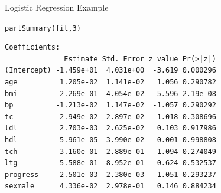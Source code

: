 \documentclass{beamer}\usepackage[]{graphicx}\usepackage[]{color}
\makeatletter
\newcommand{\hlnum}[1]{\textcolor[rgb]{0.69,0.494,0}{#1}}%
\newcommand{\hlstr}[1]{\textcolor[rgb]{0.749,0.012,0.012}{#1}}%
\newcommand{\hlcom}[1]{\textcolor[rgb]{0.514,0.506,0.514}{\textit{#1}}}%
\newcommand{\hlopt}[1]{\textcolor[rgb]{0,0,0}{#1}}%
\newcommand{\hlstd}[1]{\textcolor[rgb]{0,0,0}{#1}}%
\newcommand{\hlkwb}[1]{\textcolor[rgb]{0,0.341,0.682}{#1}}%
\newcommand{\hlkwc}[1]{\textcolor[rgb]{0,0,0}{\textbf{#1}}}%
\newcommand{\hlkwd}[1]{\textcolor[rgb]{0.004,0.004,0.506}{#1}}%
\newenvironment{kframe}{%
 \def\at@end@of@kframe{}%
 \ifinner\ifhmode%
  \def\at@end@of@kframe{\end{minipage}}%
  \begin{minipage}{\columnwidth}%
 \fi\fi%
 \def\FrameCommand##1{\hskip\@totalleftmargin \hskip-\fboxsep
 \colorbox{shadecolor}{##1}\hskip-\fboxsep
     \hskip-\linewidth \hskip-\@totalleftmargin \hskip\columnwidth}%
 \MakeFramed {\advance\hsize-\width
   \@totalleftmargin\z@ \linewidth\hsize
   \@setminipage}}%
 {\par\unskip\endMakeFramed%
 \at@end@of@kframe}
\newenvironment{knitrout}{}{} %
\makeatother
\begin{document}


\begin{frame}[fragile]{Logistic Regression Example}

\begin{knitrout}\footnotesize
{}\color{fgcolor}\begin{kframe}
\begin{alltt}
\hlkwd{partSummary}\hlstd{(fit,} \hlnum{3}\hlstd{)}
\end{alltt}
\begin{verbatim}
Coefficients:
              Estimate Std. Error z value Pr(>|z|)
(Intercept) -1.459e+01  4.031e+00  -3.619 0.000296
age          1.205e-02  1.141e-02   1.056 0.290782
bmi          2.269e-01  4.054e-02   5.596 2.19e-08
bp          -1.213e-02  1.147e-02  -1.057 0.290292
tc           2.949e-02  2.897e-02   1.018 0.308696
ldl          2.703e-03  2.625e-02   0.103 0.917986
hdl         -5.961e-05  3.990e-02  -0.001 0.998808
tch         -3.160e-01  2.889e-01  -1.094 0.274049
ltg          5.588e-01  8.952e-01   0.624 0.532537
progress     2.501e-03  2.380e-03   1.051 0.293237
sexmale      4.336e-02  2.978e-01   0.146 0.884234
\end{verbatim}
\end{kframe}
\end{knitrout}

\end{frame}
\end{document}

